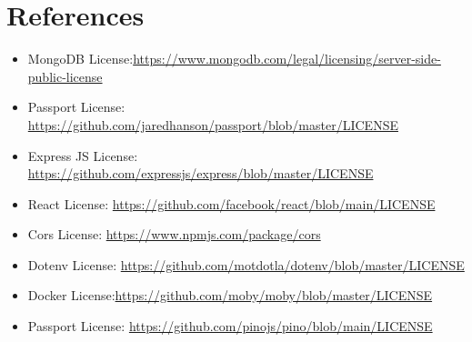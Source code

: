 \section{References}
\begin{itemize}
    \item MongoDB License:\href{https://www.mongodb.com/legal/licensing/server-side-public-license}{https://www.mongodb.com/legal/licensing/server-side-public-license}
    \item Passport License: \href{https://github.com/jaredhanson/passport/blob/master/LICENSE}{https://github.com/jaredhanson/passport/blob/master/LICENSE}
    \item Express JS License: \href{https://github.com/expressjs/express/blob/master/LICENSE}{https://github.com/expressjs/express/blob/master/LICENSE}
    \item React License: \href{https://github.com/facebook/react/blob/main/LICENSE}{https://github.com/facebook/react/blob/main/LICENSE}
    \item Cors License: \href{https://www.npmjs.com/package/cors}{https://www.npmjs.com/package/cors}
    \item Dotenv License: \href{https://github.com/motdotla/dotenv/blob/master/LICENSE}{https://github.com/motdotla/dotenv/blob/master/LICENSE}
    \item Docker License:\href{https://github.com/moby/moby/blob/master/LICENSE}{https://github.com/moby/moby/blob/master/LICENSE}
    \item Passport License: \href{https://github.com/pinojs/pino/blob/main/LICENSE}{https://github.com/pinojs/pino/blob/main/LICENSE}
\end{itemize}